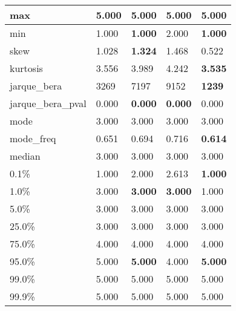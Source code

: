 \begin{table}[H]
\begin{tabular}{|l|m{10em}|m{10em}|m{10em}|m{10em}|}
\hline max & 5.000 & 5.000 & 5.000 & 5.000 \\
\hline min & 1.000 & \bfseries 1.000 & \cellcolor[rgb]{0.9, 0.54, 0.52} 2.000 & \bfseries 1.000 \\
\hline skew & 1.028 & \bfseries 1.324 & 1.468 & \cellcolor[rgb]{0.9, 0.54, 0.52} 0.522 \\
\hline kurtosis & 3.556 & 3.989 & \cellcolor[rgb]{0.9, 0.54, 0.52} 4.242 & \bfseries 3.535 \\
\hline jarque\_bera & 3269 & 7197 & \cellcolor[rgb]{0.9, 0.54, 0.52} 9152 & \bfseries 1239 \\
\hline jarque\_bera\_pval & 0.000 & \bfseries 0.000 & \bfseries 0.000 & \cellcolor[rgb]{0.9, 0.54, 0.52} 0.000 \\
\hline mode & 3.000 & 3.000 & 3.000 & 3.000 \\
\hline mode\_freq & 0.651 & 0.694 & \cellcolor[rgb]{0.9, 0.54, 0.52} 0.716 & \bfseries 0.614 \\
\hline median & 3.000 & 3.000 & 3.000 & 3.000 \\
\hline 0.1\% & 1.000 & 2.000 & \cellcolor[rgb]{0.9, 0.54, 0.52} 2.613 & \bfseries 1.000 \\
\hline 1.0\% & 3.000 & \bfseries 3.000 & \bfseries 3.000 & \cellcolor[rgb]{0.9, 0.54, 0.52} 1.000 \\
\hline 5.0\% & 3.000 & 3.000 & 3.000 & 3.000 \\
\hline 25.0\% & 3.000 & 3.000 & 3.000 & 3.000 \\
\hline 75.0\% & 4.000 & 4.000 & 4.000 & 4.000 \\
\hline 95.0\% & 5.000 & \bfseries 5.000 & \cellcolor[rgb]{0.9, 0.54, 0.52} 4.000 & \bfseries 5.000 \\
\hline 99.0\% & 5.000 & 5.000 & 5.000 & 5.000 \\
\hline 99.9\% & 5.000 & 5.000 & 5.000 & 5.000 \\
\hline
\end{tabular}
\end{table}
